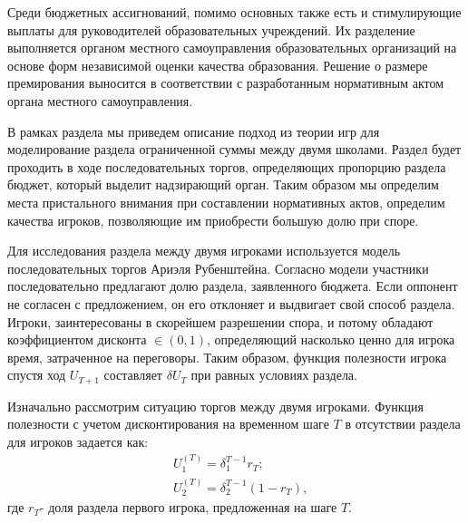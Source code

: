 Среди бюджетных ассигнований, помимо основных также есть и стимулирующие выплаты для руководителей образовательных учреждений. Их разделение выполняется органом местного самоуправления образовательных организаций на основе форм независимой оценки качества образования.
Решение о размере премирования выносится в соответствии с разработанным нормативным актом органа местного самоуправления. 

В рамках раздела мы приведем описание подход из теории игр для моделирование раздела ограниченной суммы между двумя школами.
Раздел будет проходить в ходе последовательных торгов, определяющих пропорцию раздела бюджет, который выделит надзирающий орган.
Таким образом мы определим места пристального внимания при составлении нормативных актов, определим качества игроков, позволяющие им приобрести большую долю при споре.

Для исследования раздела между двумя игроками используется модель последовательных торгов Ариэля Рубенштейна.
Согласно модели участники последовательно предлагают долю раздела, заявленного бюджета.
Если оппонент не согласен с предложением, он его отклоняет и выдвигает свой способ раздела. 
Игроки, заинтересованы в скорейшем разрешении спора, и потому обладают коэффициентом дисконта  $\in (0,1)$, определяющий насколько ценно для игрока время, затраченное на переговоры.
Таким образом, функция полезности игрока спустя ход $U_{T+1}$ составляет $\delta U_T$ при равных условиях раздела.

Изначально рассмотрим ситуацию торгов между двумя игроками. Функция полезности с учетом дисконтирования на временном шаге $T$ в отсутствии раздела для игроков задается как:
\begin{equation}
	\begin{aligned}
		&U_1^{(T)}= \delta_{1}^{T-1}r_T; \\
		&U_2^{(T)}= \delta_{2}^{T-1}(1-r_T),
	\end{aligned}
\end{equation}
где $r_T$- доля раздела первого игрока, предложенная на шаге $T$.

